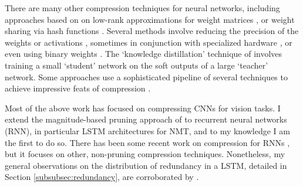 \begin{sloppypar}
There are many other compression techniques for neural networks, including approaches based on on low-rank approximations for weight matrices \cite{jaderberg2014speeding,denton2014exploiting}, or weight sharing  via hash functions \cite{chen2015compressing}.
Several methods involve reducing the precision of the weights or activations \cite{courbariaux2015low}, sometimes in conjunction with specialized hardware \cite{gupta2015deep}, or even using binary weights \cite{lin2015neural}.
The `knowledge distillation' technique of \cite{hinton2015distilling} involves training a small `student' network on the soft outputs of a large `teacher' network.
Some approaches use a sophisticated pipeline of several techniques to achieve impressive feats of compression \cite{han2015deep,iandola2016squeezenet}.
\end{sloppypar}

Most of the above work has focused on compressing CNNs for vision tasks. 
I extend the magnitude-based pruning approach of \cite{han2015learning} to recurrent neural networks (RNN), in particular LSTM architectures for NMT, and to my knowledge I am the first to do so.
There has been some recent work on compression for RNNs \cite{lu2016learning,prabhavalkar2016compression}, but it focuses on other, non-pruning compression techniques. 
Nonetheless, my general observations on the distribution of redundancy in a
LSTM, detailed in Section \ref{subsubsec:redundancy}, are corroborated by \cite{lu2016learning}.
